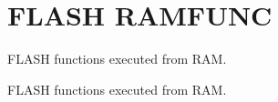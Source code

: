 \hypertarget{group___f_l_a_s_h___r_a_m_f_u_n_c}{}\section{F\+L\+A\+SH R\+A\+M\+F\+U\+NC}
\label{group___f_l_a_s_h___r_a_m_f_u_n_c}


F\+L\+A\+SH functions executed from R\+AM.  


F\+L\+A\+SH functions executed from R\+AM. 

